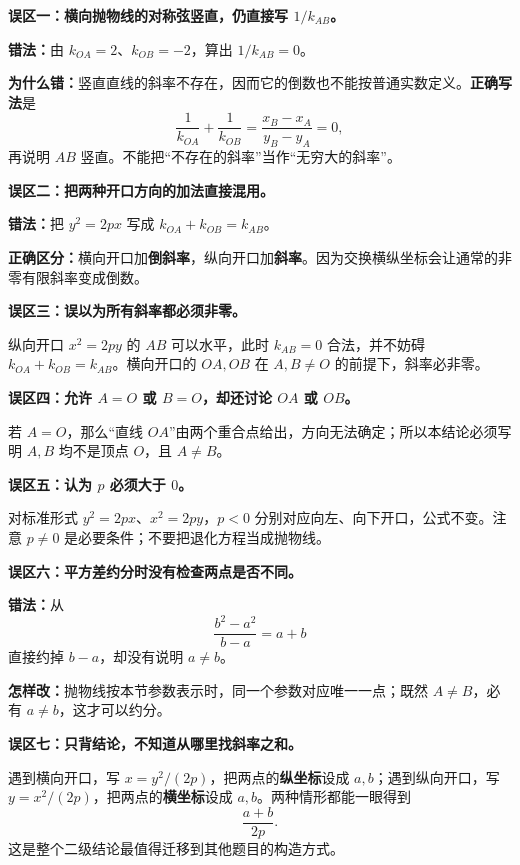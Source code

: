 \clearpage
\begin{trapbox}
\textbf{误区一：横向抛物线的对称弦竖直，仍直接写 $1/k_{AB}$。}
\begin{center}\end{center}

\textbf{错法：}由 $k_{OA}=2$、$k_{OB}=-2$，算出 $1/k_{AB}=0$。

\textbf{为什么错：}竖直直线的斜率不存在，因而它的倒数也不能按普通实数定义。\textbf{正确写法}是
\[
\frac1{k_{OA}}+\frac1{k_{OB}}
=\frac{x_B-x_A}{y_B-y_A}=0,
\]
再说明 $AB$ 竖直。不能把“不存在的斜率”当作“无穷大的斜率”。

\medskip
\textbf{误区二：把两种开口方向的加法直接混用。}

\textbf{错法：}把 $y^2=2px$ 写成 $k_{OA}+k_{OB}=k_{AB}$。

\textbf{正确区分：}横向开口加\textbf{倒斜率}，纵向开口加\textbf{斜率}。因为交换横纵坐标会让通常的非零有限斜率变成倒数。
\end{trapbox}

\clearpage
\begin{trapbox}
\textbf{误区三：误以为所有斜率都必须非零。}

纵向开口 $x^2=2py$ 的 $AB$ 可以水平，此时 $k_{AB}=0$ 合法，并不妨碍 $k_{OA}+k_{OB}=k_{AB}$。横向开口的 $OA,OB$ 在 $A,B\ne O$ 的前提下，斜率必非零。

\medskip
\textbf{误区四：允许 $A=O$ 或 $B=O$，却还讨论 $OA$ 或 $OB$。}
\begin{center}\end{center}

若 $A=O$，那么“直线 $OA$”由两个重合点给出，方向无法确定；所以本结论必须写明 $A,B$ 均不是顶点 $O$，且 $A\ne B$。

\medskip
\textbf{误区五：认为 $p$ 必须大于 $0$。}

对标准形式 $y^2=2px$、$x^2=2py$，$p<0$ 分别对应向左、向下开口，公式不变。注意 $p\ne0$ 是必要条件；不要把退化方程当成抛物线。
\end{trapbox}

\clearpage
\begin{trapbox}
\textbf{误区六：平方差约分时没有检查两点是否不同。}

\textbf{错法：}从
\[
\frac{b^2-a^2}{b-a}=a+b
\]
直接约掉 $b-a$，却没有说明 $a\ne b$。

\textbf{怎样改：}抛物线按本节参数表示时，同一个参数对应唯一一点；既然 $A\ne B$，必有 $a\ne b$，这才可以约分。

\medskip
\textbf{误区七：只背结论，不知道从哪里找斜率之和。}

遇到横向开口，写 $x=y^2/(2p)$，把两点的\textbf{纵坐标}设成 $a,b$；遇到纵向开口，写 $y=x^2/(2p)$，把两点的\textbf{横坐标}设成 $a,b$。两种情形都能一眼得到
\[
\boxed{\frac{a+b}{2p}}.
\]
这是整个二级结论最值得迁移到其他题目的构造方式。
\end{trapbox}

